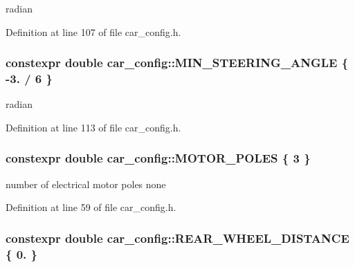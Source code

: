 radian 



Definition at line 107 of file car\+\_\+config.\+h.

\subsubsection[{\texorpdfstring{M\+I\+N\+\_\+\+S\+T\+E\+E\+R\+I\+N\+G\+\_\+\+A\+N\+G\+LE}{MIN_STEERING_ANGLE}}]{\setlength{\rightskip}{0pt plus 5cm}constexpr double car\+\_\+config\+::\+M\+I\+N\+\_\+\+S\+T\+E\+E\+R\+I\+N\+G\+\_\+\+A\+N\+G\+LE \{ -\/3. / 6 \}}\hypertarget{namespacecar__config_a38229ce5d2e17e0c30b86864fb20d9ce}{}\label{namespacecar__config_a38229ce5d2e17e0c30b86864fb20d9ce}


radian 



Definition at line 113 of file car\+\_\+config.\+h.

\subsubsection[{\texorpdfstring{M\+O\+T\+O\+R\+\_\+\+P\+O\+L\+ES}{MOTOR_POLES}}]{\setlength{\rightskip}{0pt plus 5cm}constexpr double car\+\_\+config\+::\+M\+O\+T\+O\+R\+\_\+\+P\+O\+L\+ES \{ 3 \}}\hypertarget{namespacecar__config_a611a0f02cf52db1d438a2dd53b642cd5}{}\label{namespacecar__config_a611a0f02cf52db1d438a2dd53b642cd5}


number of electrical motor poles  none 



Definition at line 59 of file car\+\_\+config.\+h.

\subsubsection[{\texorpdfstring{R\+E\+A\+R\+\_\+\+W\+H\+E\+E\+L\+\_\+\+D\+I\+S\+T\+A\+N\+CE}{REAR_WHEEL_DISTANCE}}]{\setlength{\rightskip}{0pt plus 5cm}constexpr double car\+\_\+config\+::\+R\+E\+A\+R\+\_\+\+W\+H\+E\+E\+L\+\_\+\+D\+I\+S\+T\+A\+N\+CE \{ 0. \}}\hypertarget{namespacecar__config_a43e668702c6dc662ff95f80047ee5500}{}\label{namespacecar__config_a43e668702c6dc662ff95f80047ee5500}



